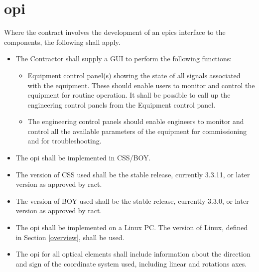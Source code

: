 \documentclass[11pt
  , a4paper
  , article
  , oneside
]{memoir}
\begin{document}
\section{\Gls{opi}}
Where the contract involves the development of an \Gls{epics} interface to the components, the following shall apply.
\begin{itemize}
\item The Contractor shall supply a GUI to perform the following functions:
  \begin{itemize}
  \item Equipment control panel(s) showing the state of all signals associated with the equipment. These should enable users to monitor and control the equipment for routine operation. It shall be possible to call up the engineering control panels from the Equipment control panel.
  \item The engineering control panels should enable engineers to monitor and control all the available parameters of the equipment for commissioning and for troubleshooting.
  \end{itemize}
\item The \Gls{opi} shall be implemented in CSS/BOY.
\item The version of CSS used shall be the stable release, currently 3.3.11, or later version as approved by \Gls{ract}.
\item The version of BOY used shall be the stable release, currently 3.3.0, or later version as approved by \Gls{ract}.
\item The \Gls{opi} shall be implemented on a Linux PC. The version of Linux, defined in Section \ref{overview}, shall be used.
\item The \Gls{opi} for all optical elements shall include information about the direction and sign of the coordinate system used, including linear and rotations axes.

\end{itemize}
\end{document}
